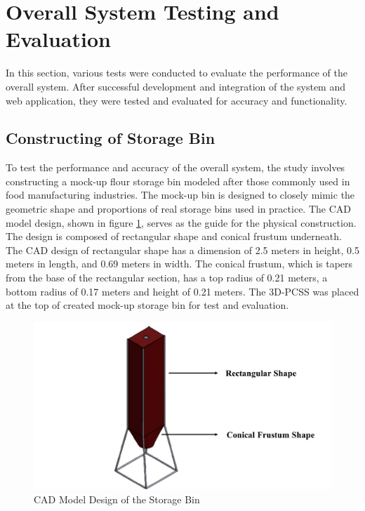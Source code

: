\section{Overall System Testing and Evaluation}
\label{ch3:sec:TestingAndEvaluation}

In this section, various tests were conducted to evaluate the performance of the overall system. After successful development and integration of the system and web application, they were tested and evaluated for accuracy and functionality.

\subsection{Constructing of Storage Bin}
\label{ch3:subsec:Modeling of Flour Bin}
To test the performance and accuracy of the overall system, the study involves constructing a mock-up flour storage bin modeled after those commonly used in food manufacturing industries. The mock-up bin is designed to closely mimic the geometric shape and proportions of real storage bins used in practice. The CAD model design, shown in figure \ref{ch3:fig:cad_storage_bin}, serves as the guide for the physical construction. The design is composed of rectangular shape and conical frustum underneath. The CAD design of rectangular shape has a dimension of 2.5 meters in height, 0.5 meters in length, and 0.69 meters in width. The conical frustum, which is tapers from the base of the rectangular section, has a top radius of 0.21 meters, a bottom radius of 0.17 meters and height of 0.21 meters. The 3D-PCSS was placed at the top of created mock-up storage bin for test and evaluation.

\begin{figure}[H]
	\centering
	\includegraphics[width=1\textwidth]{Figures/cad_storage_bin}
	\caption{CAD Model Design of the Storage Bin}
	\label{ch3:fig:cad_storage_bin}
\end{figure}

